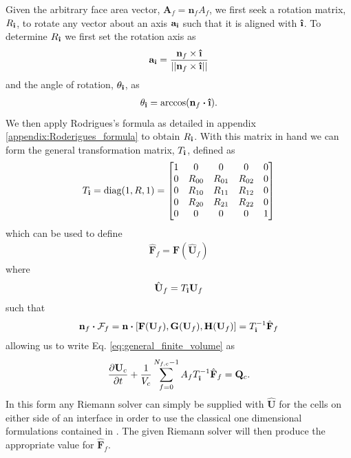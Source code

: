 \documentclass[10pt,letterpaper,notitlepage]{article}
\numberwithin{equation}{section}
\newcommand{\partialderiv}[2]{\frac{\partial #1}{\partial #2}}
\newcommand{\dotp}{\boldsymbol{\cdot}}
\newcommand{\uvec}[1]{\boldsymbol{\hat{\textbf{#1}}}}
\newcommand{\ihat}{\uvec{\i}}
\newcommand{\hatbf}[1]{\hat{\mathbf{#1}}}
\newcommand{\beqn}{\begin{equation}\begin{aligned}}
\newcommand{\eeqn}{\end{aligned}\end{equation}}
\begin{document}
Given the arbitrary face area vector, $\mathbf{A}_f=\mathbf{n}_f A_f$, we first seek a rotation matrix, $R_{\ihat}$, to rotate any vector about an axis $\mathbf{a}_{\ihat}$ such that it is aligned with $\ihat$. To determine $R_{\ihat}$ we first set the rotation axis as
\beqn 
\mathbf{a}_{\ihat} = \frac{\mathbf{n}_f \times \ihat}{||\mathbf{n}_f \times \ihat||}
\eeqn 
and the angle of rotation, $\theta_{\ihat}$, as
\beqn 
\theta_{\ihat} = \arccos (\mathbf{n}_f \dotp \ihat).
\eeqn 
We then apply Rodrigues's formula as detailed in appendix \ref{appendix:Roderigues_formula} to obtain $R_{\ihat}$. With this matrix in hand we can form the general transformation matrix, $T_{\ihat}$, defined as
\beqn
T_{\ihat} = \text{diag}(1,R,1) = 
\begin{bmatrix}
1 & 0         & 0         & 0         & 0 \\
0 & R_{00} & R_{01} & R_{02} & 0 \\
0 & R_{10} & R_{11} & R_{12} & 0 \\
0 & R_{20} & R_{21} & R_{22} & 0 \\
0 & 0         & 0         & 0         & 1 \\
\end{bmatrix}
\eeqn
which can be used to define 
\beqn 
\hatbf{F}_f = \mathbf{F}(\hatbf{U}_f)
\eeqn 
where
\beqn 
\hatbf{U}_f = T_{\ihat} \mathbf{U}_f
\eeqn 
such that
\beqn 
\mathbf{n}_f \dotp \mathcal{F}_f
= \mathbf{n} \dotp [
\mathbf{F}(\mathbf{U}_f),
\mathbf{G}(\mathbf{U}_f),
\mathbf{H}(\mathbf{U}_f)]
=
T_{\ihat}^{-1} \hatbf{F}_f
\eeqn 
allowing us to write Eq. \eqref{eq:general_finite_volume} as 
\beqn 
\partialderiv{\mathbf{U}_c}{t} 
+ 
\frac{1}{V_c}
\sum_{f=0}^{N_{f,c}{-}1} 
A_f  T_{\ihat}^{-1} \hatbf{F}_f
=  \mathbf{Q}_c.
\eeqn 
In this form any Riemann solver can simply be supplied with $\hat{\mathbf{U}}$ for the cells on either side of an interface in order to use the classical one dimensional formulations contained in \cite{Toro}. The given Riemann solver will then produce the appropriate value for $\hatbf{F}_f$.
\end{document}
